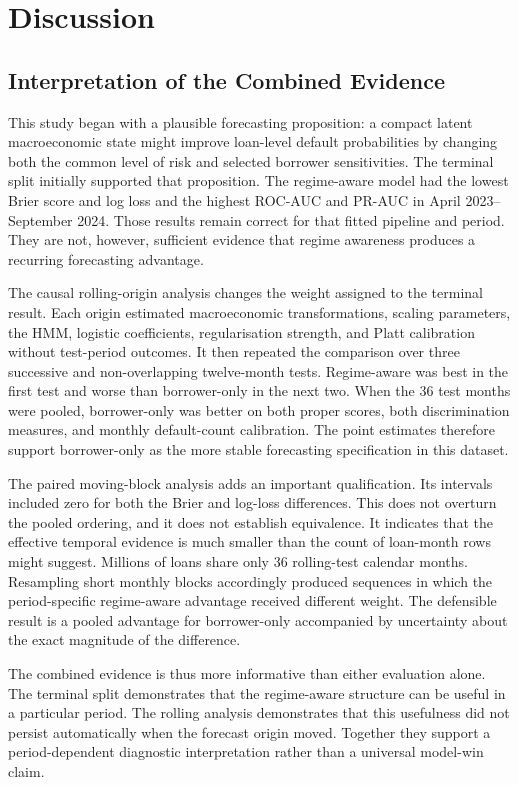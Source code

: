 \chapter{Discussion}
\label{chap:discussion}

\section{Interpretation of the Combined Evidence}

This study began with a plausible forecasting proposition: a compact latent macroeconomic state might improve loan-level default probabilities by changing both the common level of risk and selected borrower sensitivities. The terminal split initially supported that proposition. The regime-aware model had the lowest Brier score and log loss and the highest ROC-AUC and PR-AUC in April 2023--September 2024. Those results remain correct for that fitted pipeline and period. They are not, however, sufficient evidence that regime awareness produces a recurring forecasting advantage.

The causal rolling-origin analysis changes the weight assigned to the terminal result. Each origin estimated macroeconomic transformations, scaling parameters, the HMM, logistic coefficients, regularisation strength, and Platt calibration without test-period outcomes. It then repeated the comparison over three successive and non-overlapping twelve-month tests. Regime-aware was best in the first test and worse than borrower-only in the next two. When the 36 test months were pooled, borrower-only was better on both proper scores, both discrimination measures, and monthly default-count calibration. The point estimates therefore support borrower-only as the more stable forecasting specification in this dataset.

The paired moving-block analysis adds an important qualification. Its intervals included zero for both the Brier and log-loss differences. This does not overturn the pooled ordering, and it does not establish equivalence. It indicates that the effective temporal evidence is much smaller than the count of loan-month rows might suggest. Millions of loans share only 36 rolling-test calendar months. Resampling short monthly blocks accordingly produced sequences in which the period-specific regime-aware advantage received different weight. The defensible result is a pooled advantage for borrower-only accompanied by uncertainty about the exact magnitude of the difference.

The combined evidence is thus more informative than either evaluation alone. The terminal split demonstrates that the regime-aware structure can be useful in a particular period. The rolling analysis demonstrates that this usefulness did not persist automatically when the forecast origin moved. Together they support a period-dependent diagnostic interpretation rather than a universal model-win claim.

